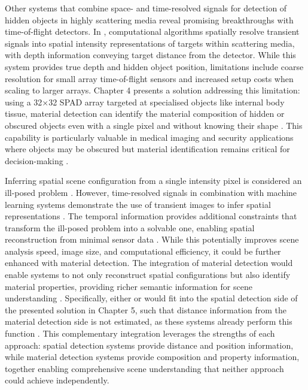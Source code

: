 \documentclass[12pt,a4paper,oneside]{report}
\begin{document}
Other systems that combine space- and time-resolved signals for detection of hidden objects in highly scattering media reveal promising breakthroughs with time-of-flight detectors. In \cite{lyons2019}, computational algorithms spatially resolve transient signals into spatial intensity representations of targets within scattering media, with depth information conveying target distance from the detector. While this system provides true depth and hidden object position, limitations include coarse resolution for small array time-of-flight sensors and increased setup costs when scaling to larger arrays. Chapter 4 presents a solution addressing this limitation: using a 32×32 SPAD array targeted at specialised objects like internal body tissue, material detection can identify the material composition of hidden or obscured objects even with a single pixel and without knowing their shape \cite{su2016}. This capability is particularly valuable in medical imaging and security applications where objects may be obscured but material identification remains critical for decision-making \cite{lyons2019,tye2025}.

Inferring spatial scene configuration from a single intensity pixel is considered an ill-posed problem \cite{pizlo2001}. However, time-resolved signals in combination with machine learning systems demonstrate the use of transient images to infer spatial representations \cite{turpin2019,jungerman2022}. The temporal information provides additional constraints that transform the ill-posed problem into a solvable one, enabling spatial reconstruction from minimal sensor data \cite{turpin2019}. While this potentially improves scene analysis speed, image size, and computational efficiency, it could be further enhanced with material detection. The integration of material detection would enable systems to not only reconstruct spatial configurations but also identify material properties, providing richer semantic information for scene understanding \cite{su2016,becker2023,yang2024}. Specifically, either \cite{turpin2019} or \cite{lyons2019} would fit into the spatial detection side of the presented solution in Chapter 5, such that distance information from the material detection side is not estimated, as these systems already perform this function \cite{yang2023,yang2024}. This complementary integration leverages the strengths of each approach: spatial detection systems provide distance and position information, while material detection systems provide composition and property information, together enabling comprehensive scene understanding that neither approach could achieve independently.
\end{document}

